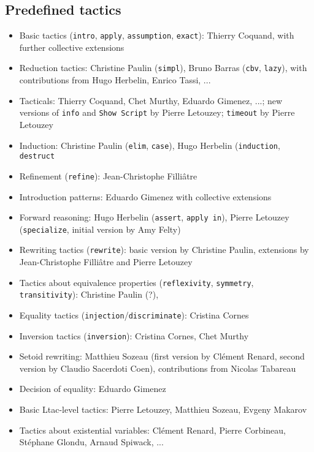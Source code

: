 \documentclass{article}
\begin{document}
\subsection{Predefined tactics}

\begin{itemize}
\item Basic tactics (\texttt{intro}, \texttt{apply},
  \texttt{assumption}, \texttt{exact}): Thierry Coquand, with further
  collective extensions
\item Reduction tactics: Christine Paulin (\texttt{simpl}), Bruno
  Barras (\texttt{cbv}, \texttt{lazy}), with contributions from Hugo Herbelin, Enrico Tassi, ...
\item Tacticals: Thierry Coquand, Chet Murthy, Eduardo Gimenez, ...;
  new versions of {\tt info} and {\tt Show Script} by Pierre Letouzey;
  {\tt timeout} by Pierre Letouzey
\item Induction: Christine Paulin (\texttt{elim}, \texttt{case}), Hugo Herbelin (\texttt{induction}, \texttt{destruct}
\item Refinement (\texttt{refine}): Jean-Christophe Filliâtre
\item Introduction patterns: Eduardo Gimenez with collective extensions
\item Forward reasoning: Hugo Herbelin (\texttt{assert}, \texttt{apply in}), Pierre Letouzey (\texttt{specialize}, initial version by Amy Felty)
\item Rewriting tactics (\texttt{rewrite}): basic version by Christine Paulin,
  extensions by Jean-Christophe Filliâtre and Pierre Letouzey
\item Tactics about equivalence properties (\texttt{reflexivity},
  \texttt{symmetry}, \texttt{transitivity}): Christine Paulin (?),
\item Equality tactics (\texttt{injection}/\texttt{discriminate}):
  Cristina Cornes
\item Inversion tactics (\texttt{inversion}): Cristina Cornes, Chet Murthy
\item Setoid rewriting: Matthieu Sozeau (first version by Clément
  Renard, second version by Claudio Sacerdoti Coen), contributions
  from Nicolas Tabareau
\item Decision of equality: Eduardo Gimenez
\item Basic Ltac-level tactics: Pierre Letouzey, Matthieu Sozeau,
  Evgeny Makarov
\item Tactics about existential variables: Clément Renard, Pierre Corbineau, Stéphane Glondu, Arnaud Spiwack, ...
\end{itemize}
\end{document}
